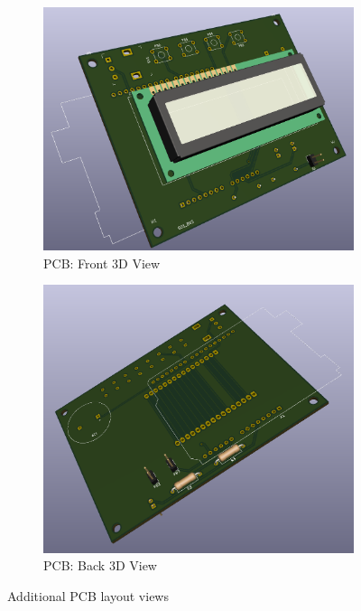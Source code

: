 \documentclass{article}
\begin{document}
\begin{figure}[h]
\begin{subfigure}{0.4\textwidth}
        \includegraphics[width=\textwidth]{PCB_3D.PNG}
        \caption{PCB: Front 3D View}
    \end{subfigure}
    \begin{subfigure}{0.4\textwidth}
        \includegraphics[width=\textwidth]{PCB_3D_Back.PNG}
        \caption{PCB: Back 3D View}
    \end{subfigure}


    \caption{Additional PCB layout views}
    \label{fig:more_pcb}
\end{figure}
\end{document}
